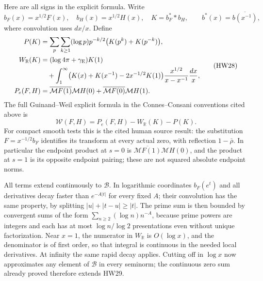 \documentclass[11pt]{article}
\newcommand{\R}{\mathbb R}
\newcommand{\B}{\mathscr B}
\newcommand{\M}{\mathcal M}
\begin{document}
Here are all signs in the explicit formula. Write
\[
 b_F(x)=x^{1/2}F(x),\quad b_H(x)=x^{1/2}H(x),\quad
 K=b_F^**b_H,\qquad b^*(x)=\overline{b(x^{-1})},
 \tag{HW27}
\]
where convolution uses \(dx/x\). Define
\[
 \begin{split}
 P(K)&=\sum_{p}\sum_{k\ge1}(\log p)p^{-k/2}
                          \bigl(K(p^k)+K(p^{-k})\bigr),\\
 W_\R(K)&=(\log4\pi+\gamma_{\rm E})K(1)\\
 &\quad+\int_1^\infty
  \bigl(K(x)+K(x^{-1})-2x^{-1/2}K(1)\bigr)
               \frac{x^{1/2}}{x-x^{-1}}\frac{dx}{x},\\
 P_e(F,H)&=\overline{\M F(1)}\M H(0)
                         +\overline{\M F(0)}\M H(1).
 \end{split}
 \tag{HW28}\label{hw:localterms}
\]
The full Guinand--Weil explicit formula in the Connes--Consani
conventions cited above is
\[
 \mathcal W(F,H)=P_e(F,H)-W_\R(K)-P(K).
 \tag{HW29}\label{hw:explicit}
\]
For compact smooth tests this is the cited human source result:
the substitution \(F=x^{-1/2}b_F\) identifies its transform
at every actual zero, with reflection \(1-\bar\rho\).
In particular the endpoint product at \(s=0\) is
\(\overline{\M F(1)}\M H(0)\), and the product at \(s=1\)
is its opposite endpoint pairing; these are not squared
absolute endpoint norms.

All terms extend continuously to \(\B\).
In logarithmic coordinates \(b_F(e^t)\) and all derivatives
decay faster than \(e^{-A|t|}\) for every fixed \(A\);
their convolution has the same property, by splitting
\(|u|+|t-u|\ge |t|\).
The prime sum is then bounded by convergent sums of the form
\(\sum_{n\ge2}(\log n)n^{-A}\), because prime powers are
integers and each has at most \(\log n/\log2\) presentations
even without unique factorization. Near \(x=1\), the numerator
in \(W_\R\) is \(O(\log x)\), and the denominator is of
first order, so that integral is continuous in the needed
local derivatives. At infinity the same rapid decay applies.
Cutting off in \(\log x\) now approximates any element of
\(\B\) in every seminorm; the continuous zero sum already
proved therefore extends HW29.
\end{document}
